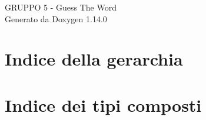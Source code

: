 \documentclass[twoside]{book}
\newcommand{\+}{\discretionary{\mbox{\scriptsize$\hookleftarrow$}}{}{}}
\newcommand{\clearemptydoublepage}{%
    \newpage{\pagestyle{empty}\cleardoublepage}%
  }
\begin{document}
  \raggedbottom
    \hypersetup{pageanchor=false,
                bookmarksnumbered=true,
                pdfencoding=unicode
               }
  \begin{titlepage}
  \vspace*{7cm}
  \begin{center}%
  {\Large GRUPPO 5 -\/ Guess The Word}\\
  \vspace*{1cm}
  {\large Generato da Doxygen 1.14.0}\\
  \end{center}
  \end{titlepage}
  \clearemptydoublepage
  \tableofcontents
  \clearemptydoublepage
  \hypersetup{pageanchor=true}
\chapter{Indice della gerarchia}

\chapter{Indice dei tipi composti}

\end{document}
